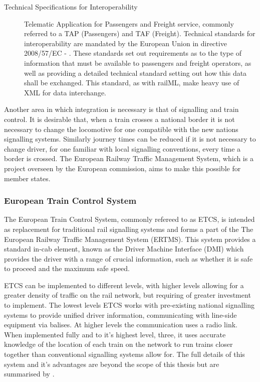\begin{description}
    \item[Technical Specifications for Interoperability] Telematic Application for Passengers and Freight service, commonly referred to a TAP (Passengers) and TAF (Freight). Technical standards for interoperability are mandated by the European Union in directive 2008/57/EC - \citet{CounciloftheEuropeanUnionq2008}. These standards set out requirements as to the type of information that must be available to passengers and freight operators, as well as providing a detailed technical standard setting out how this data shall be exchanged. This standard, as with railML, make heavy use of XML for data interchange.  
\end{description}

Another area in which integration is necessary is that of signalling and train control. It is desirable that, when a train crosses a national border it is not necessary to change the locomotive for one compatible with the new nations signalling systems. Similarly journey times can be reduced if it is not necessary to change driver, for one familiar with local signalling conventions, every time a border is crossed. The European Railway Traffic Management System, which is a project overseen by the European commission, aims to make this possible for member states.

\subsubsection{European Train Control System}
\label{sec:etcs}
The European Train Control System, commonly refereed to as ETCS, is intended as replacement for traditional rail signalling systems and forms a part of the The European Railway Traffic Management System (ERTMS). This system provides a standard in-cab element, known as the Driver Machine Interface (DMI) which provides the driver with a range of crucial information, such as whether it is safe to proceed and the maximum safe speed. 

ETCS can be implemented to different levels, with higher levels allowing for a greater density of traffic on the rail network, but requiring of greater investment to implement. The lowest levels ETCS works with pre-existing national signalling systems to provide unified driver information, communicating with line-side equipment via balises. At higher levels the communication uses a radio link. When implemented fully and to it's highest level, three, it uses accurate knowledge of the location of each train on the network to run trains closer together than conventional signalling systems allow for. The full details of this system and it's advantages are beyond the scope of this thesis but are summarised by \citet{EC2011}.


